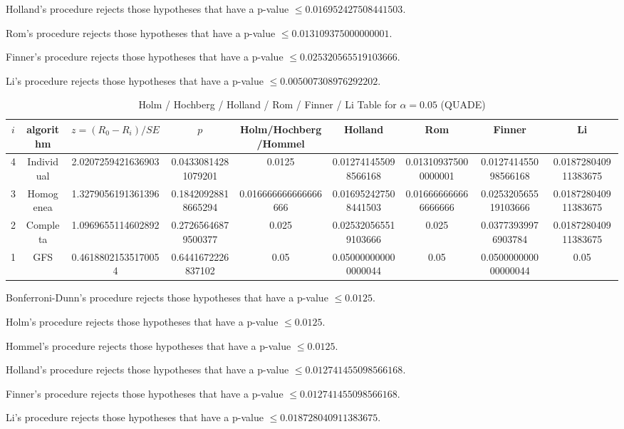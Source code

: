 \documentclass[a4paper,10pt]{article}
\begin{document}
\begin{landscape}
Holland's procedure rejects those hypotheses that have a p-value $\le0.016952427508441503$.


Rom's procedure rejects those hypotheses that have a p-value $\le0.013109375000000001$.


Finner's procedure rejects those hypotheses that have a p-value $\le0.025320565519103666$.


Li's procedure rejects those hypotheses that have a p-value $\le0.005007308976292202$.



\newpage

\begin{table}[!htp]
\centering\scriptsize
\caption{Holm / Hochberg / Holland / Rom / Finner / Li Table for $\alpha=0.05$ (QUADE)}
\begin{tabular}{ccccccccc}
$i$&algorithm&$z=(R_0 - R_i)/SE$&$p$&Holm/Hochberg/Hommel&Holland&Rom&Finner&Li\\
\hline
4&Individual&2.0207259421636903&0.04330814281079201&0.0125&0.012741455098566168&0.013109375000000001&0.012741455098566168&0.018728040911383675\\
3&Homogenea&1.3279056191361396&0.18420928818665294&0.016666666666666666&0.016952427508441503&0.016666666666666666&0.025320565519103666&0.018728040911383675\\
2&Completa&1.0969655114602892&0.27265646879500377&0.025&0.025320565519103666&0.025&0.03773939976903784&0.018728040911383675\\
1&GFS&0.46188021535170054&0.6441672226837102&0.05&0.050000000000000044&0.05&0.050000000000000044&0.05\\
\hline
\end{tabular}
\end{table}
Bonferroni-Dunn's procedure rejects those hypotheses that have a p-value $\le0.0125$.


Holm's procedure rejects those hypotheses that have a p-value $\le0.0125$.


Hommel's procedure rejects those hypotheses that have a p-value $\le0.0125$.


Holland's procedure rejects those hypotheses that have a p-value $\le0.012741455098566168$.


Finner's procedure rejects those hypotheses that have a p-value $\le0.012741455098566168$.


Li's procedure rejects those hypotheses that have a p-value $\le0.018728040911383675$.



\newpage


\end{landscape}
\end{document}
